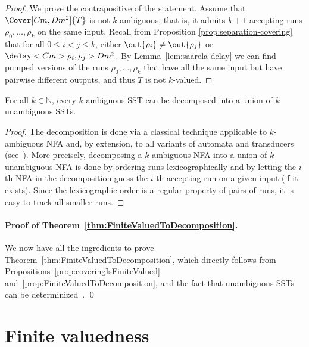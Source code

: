 \documentclass{article}
\begin{document}
\begin{proof}
We prove the contrapositive of the statement. Assume that 
$\Cover[Cm,Dm^2]{T}$ is not $k$-ambiguous, that is, 
it admits $k+1$ accepting runs $\rho_0, \dots, \rho_k$ 
on the same input. 
Recall from Proposition \ref{prop:separation-covering} 
that for all $0\le i<j\le k$, 
either $\out{\rho_i} \neq \out{\rho_j}$ or $\delay<Cm>{\rho_i,\rho_j} > Dm^2$.
By Lemma~\ref{lem:saarela-delay} we can find pumped versions
of the runs $\rho_0, \dots, \rho_k$ that have all the same input 
but have pairwise different outputs, and thus $T$ is not $k$-valued.
\end{proof}


\begin{proposition}\label{prop:FiniteValuedToDecomposition}
For all $k \in \mathbb{N}$, every $k$-ambiguous SST 
can be decomposed into a union of $k$ unambiguous SSTs.
\end{proposition}

\begin{proof}
The decomposition is done via a classical 
technique applicable to $k$-ambiguous NFA and, 
by extension, to all variants of automata and transducers
(see~\cite{JohnsonICALP85,Sakarovitch98}).
More precisely, decomposing a $k$-ambiguous NFA into a union of $k$ 
unambiguous NFA is done by ordering runs lexicographically 
and by letting the $i$-th NFA in the decomposition guess
the $i$-th accepting run on a given input (if it exists).
Since the lexicographic order is a regular property of pairs of runs,
it is easy to track all smaller runs.
\end{proof}


\paragraph{Proof of Theorem~\ref{thm:FiniteValuedToDecomposition}.} 
We now have all the ingredients to prove
Theorem~\ref{thm:FiniteValuedToDecomposition}, which directly
follows from Propositions~\ref{prop:coveringIsFiniteValued}
and~\ref{prop:FiniteValuedToDecomposition}, and the fact that
unambiguous SSTs can be determinized~\cite{DBLP:conf/fsttcs/AlurC10}. %
\qed




\section{Finite valuedness}\label{sec:finite-valuedness}
\end{document}
